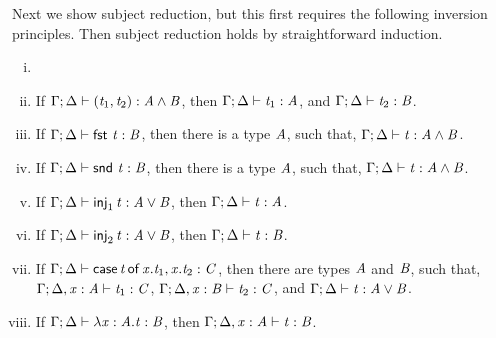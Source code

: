 Next we show subject reduction, but this first requires the following
inversion principles.  Then subject reduction holds by straightforward
induction.
\begin{lemma}[Inversion]
  \label{lemma:inversion}
  \begin{enumerate}[i.]
  \item[]
  \item If $\Gamma  ;  \Delta  \vdash  (  \mathit{t_{{\mathrm{1}}}}  ,  \mathit{t_{{\mathrm{2}}}}  )  :   \mathit{A}  \land  \mathit{B} $, then $\Gamma  ;  \Delta  \vdash  \mathit{t_{{\mathrm{1}}}}  :  \mathit{A}$, and $\Gamma  ;  \Delta  \vdash  \mathit{t_{{\mathrm{2}}}}  :  \mathit{B}$.
  \item If $\Gamma  ;  \Delta  \vdash  \mathsf{fst}\, \, \mathit{t}  :  \mathit{B}$, then there is a type $\mathit{A}$, such that, $\Gamma  ;  \Delta  \vdash  \mathit{t}  :   \mathit{A}  \land  \mathit{B} $.
  \item If $\Gamma  ;  \Delta  \vdash  \mathsf{snd}\, \, \mathit{t}  :  \mathit{B}$, then there is a type $\mathit{A}$, such that, $\Gamma  ;  \Delta  \vdash  \mathit{t}  :   \mathit{A}  \land  \mathit{B} $.
  \item If $\Gamma  ;  \Delta  \vdash  \mathsf{inj}_1\,  \mathit{t}  :   \mathit{A}  \lor  \mathit{B} $, then $\Gamma  ;  \Delta  \vdash  \mathit{t}  :  \mathit{A}$.
  \item If $\Gamma  ;  \Delta  \vdash  \mathsf{inj}_2\,  \mathit{t}  :   \mathit{A}  \lor  \mathit{B} $, then $\Gamma  ;  \Delta  \vdash  \mathit{t}  :  \mathit{B}$.
  \item If $\Gamma  ;  \Delta  \vdash   \mathsf{case}\, \mathit{t} \,\mathsf{of}\, \mathit{x} . \mathit{t_{{\mathrm{1}}}} , \mathit{x} . \mathit{t_{{\mathrm{2}}}}   :  \mathit{C}$, then there are types $\mathit{A}$ and $\mathit{B}$,
    such that, $\Gamma  ;  \Delta  ,  \mathit{x}  :  \mathit{A}  \vdash  \mathit{t_{{\mathrm{1}}}}  :  \mathit{C}$, $\Gamma  ;  \Delta  ,  \mathit{x}  :  \mathit{B}  \vdash  \mathit{t_{{\mathrm{2}}}}  :  \mathit{C}$, and $\Gamma  ;  \Delta  \vdash  \mathit{t}  :   \mathit{A}  \lor  \mathit{B} $.
  \item If $\Gamma  ;  \Delta  \vdash   \lambda  \mathit{x}  :  \mathit{A} . \mathit{t}   :  \mathit{B}$, then $\Gamma  ;  \Delta  ,  \mathit{x}  :  \mathit{A}  \vdash  \mathit{t}  :  \mathit{B}$.    

\end{enumerate}
\end{lemma}
